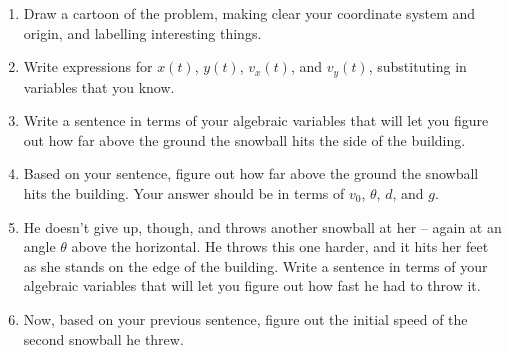 \documentclass[12pt]{article}
\begin{document}
\begin{enumerate}

\item Draw a cartoon of the problem, making clear your coordinate system and origin, and
labelling interesting things.

\vspace{2in}

\item Write expressions for $x(t)$, $y(t)$, $v_x(t)$, and $v_y(t)$, substituting in variables that you know.

\vspace{1.5in}

\item Write a sentence in terms of your algebraic variables that will let you figure out how far above the ground 
the snowball hits the side of the building.

\newpage

\item Based on your sentence, figure out how far above the ground the snowball hits the building. Your answer should be 
in terms of $v_0$, $\theta$, $d$, and $g$.

\vspace{3in}
\newpage

\item He doesn't give up, though, and throws another snowball at her -- again at an angle $\theta$ above the horizontal.
He throws this one harder, and it hits her feet as she stands on the edge of the building. Write a sentence in terms of your algebraic variables that will let you figure out how fast he had to throw it. 

\vspace{1.5in}

\item Now, based on your previous sentence, figure out the initial speed of the second snowball he threw. 

\end{enumerate}
\end{document}
